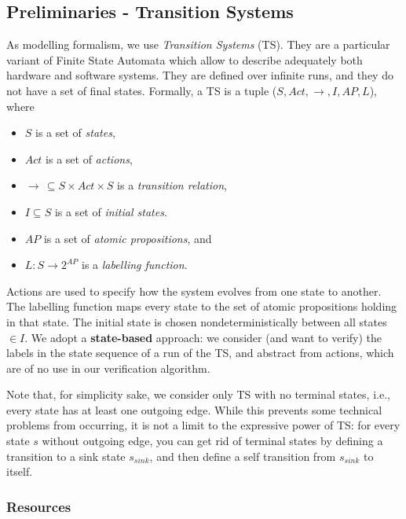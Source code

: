 \documentclass{article}
\begin{document}
\subsection{Preliminaries - Transition Systems}
\label{subsec-ts}
As modelling formalism, we use \emph{Transition Systems} (TS). They are a particular variant 
of Finite State Automata which allow to describe adequately both hardware and software systems. 
They are defined over infinite runs, and they do not have a set of final states. 
Formally, a TS is a tuple ($S, Act, \rightarrow, I, AP, L$), where 
\begin{itemize}
    \item $S$ is a set of \emph{states},
    \item $Act$ is a set of \emph{actions},
    \item $\longrightarrow\,\subseteq S \times Act \times S$ is a \emph{transition relation},
    \item $I \subseteq S$ is a set of \emph{initial states}.
    \item $AP$ is a set of \emph{atomic propositions}, and 
    \item $L : S \rightarrow 2^{AP}$ is a \emph{labelling function}.
\end{itemize}
Actions are used to specify how the system evolves from one state to another. 
The labelling function maps every state to the set of atomic propositions holding in that state. 
The initial state is chosen nondeterministically between all states $\in I$.
We adopt a \textbf{state-based} approach: we consider (and want to verify) 
the labels in the state sequence of a run of the TS, and abstract from actions, 
which are of no use in our verification algorithm. 

Note that, for simplicity sake, we consider only TS with no terminal states, i.e., 
every state has at least one outgoing edge. 
While this prevents some technical problems from occurring, 
it is not a limit to the expressive power of TS: for every state $s$ without outgoing edge, 
you can get rid of terminal states by defining a transition to a sink state $s_ {sink}$, 
and then define a self transition from $s_ {sink}$ to itself.

\subsubsection*{Resources}
\cite[Paragraph 2.1]{BaKa}

\color{red}
\end{document}
